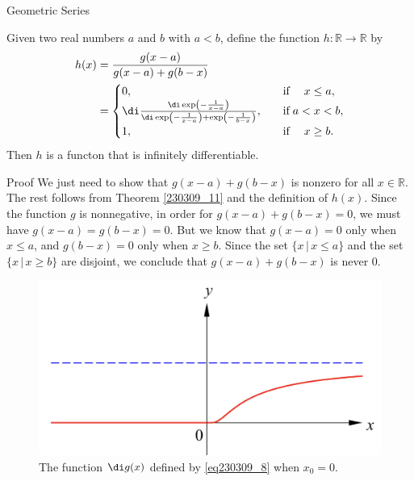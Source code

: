 \begin{example}[label=230305_16]{Geometric Series}
\begin{example}[label=230304_9]{}
\begin{example}{}
\begin{example}{}
\begin{theorem}{}
Given two real numbers $a$ and $b$ with $a<b$, define the function $h:\mathbb{R}\to\mathbb{R}$   by
\begin{equation}\label{eq230309_12}\begin{split}
h(x)&=\frac{g(x-a)}{g(x-a)+g(b-x)}\\&=\begin{cases}
0,\quad &\text{if}\; \quad x\leq a,\\ \di \frac{\di\exp\left(-\frac{1}{x-a}\right)}{\di\exp\left(-\frac{1}{x-a}\right)+\exp\left(-\frac{1}{b-x}\right)},\quad &\text{if}\;a<x<b,\\1,\quad &\text{if}\; \quad x\geq b.\end{cases}\end{split}\end{equation}Then $h$ is a functon that is infinitely differentiable.
\end{theorem}
 
\begin{myproof}{Proof}
We just need to show that $g(x-a)+g(b-x)$ is nonzero for all $x\in\mathbb{R}$. The rest follows from Theorem \ref{230309_11} and the definition of $h(x)$. Since the function $g$ is nonnegative, in order for $g(x-a)+g(b-x)=0$, we must have $g(x-a)=g(b-x)=0$. But we know that $g(x-a)=0$ only  when $x\leq a$, and $g(b-x)=0$ only when $x\geq b$. Since the set $\{x\,|\,x\leq a\}$ and the set $\{x\,|\,x\geq b\}$ are disjoint, we conclude that $g(x-a)+g(b-x)$ is never 0.
\end{myproof}
 
\begin{figure}[ht]
\centering
\includegraphics[scale=0.2]{Picture61.png}
\caption{The function $\di g(x)$ defined by \eqref{eq230309_8} when $x_0=0$.\fa}\label{figure61}
\end{figure}


\end{example}
\end{example}
\end{example}
\end{example}
